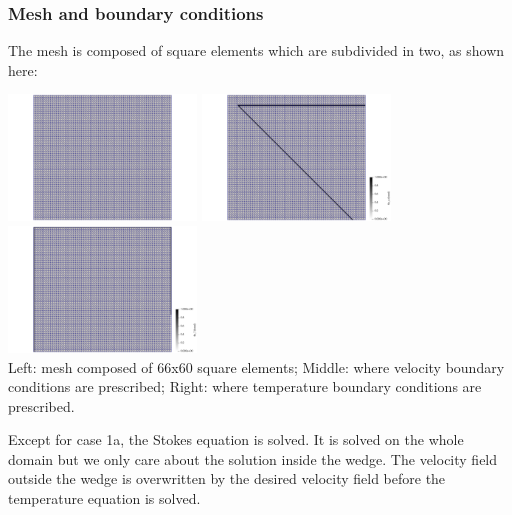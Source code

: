 \subsubsection*{Mesh and boundary conditions}

The mesh is composed of square elements which are subdivided in two, as shown here:

\begin{center}
\includegraphics[width=5cm]{python_codes/fieldstone_68/results/case1a/mesh}
\includegraphics[width=5cm]{python_codes/fieldstone_68/results/case1a/fix_uv}
\includegraphics[width=5cm]{python_codes/fieldstone_68/results/case1a/fix_T}\\
{\captionfont Left: mesh composed of 66x60 square elements; 
Middle: where velocity boundary conditions are prescribed;
Right: where temperature boundary conditions are prescribed.}
\end{center}

Except for case 1a, the Stokes equation is solved. It is solved on the whole domain 
but we only care about the solution inside the wedge. The velocity field outside the wedge 
is overwritten by the desired velocity field before the temperature equation is solved.


